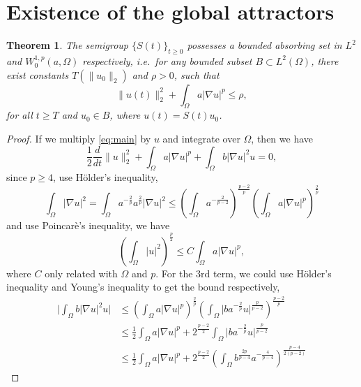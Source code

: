 \documentclass[11pt]{amsart}
\newtheorem{theorem}{Theorem}[section]
\theoremstyle{definition}
\numberwithin{equation}{section}
\newcommand*\abs[1]{\lvert#1\rvert}
\newcommand*\norm[1]{\lVert#1\rVert}
\newcommand*\Brace[1]{\lbrace#1\rbrace}
\begin{document}
\section{Existence of the global attractors}
\begin{theorem}
	The semigroup $\Brace{S(t)}_{t \geq 0} $ possesses a bounded absorbing set in
	$L^2$ and $W_0^{1,p}(a,\Omega)$ respectively, i.e.\ for any bounded subset
	$B \subset L^2(\Omega)$, there exist constants $T(\norm{u_0}_2)$ and $\rho > 0$, such that
	\begin{equation}
		\norm{u(t)}_2^2 + \int_{\Omega}a\abs{\nabla u}^p \leq \rho,
	\end{equation}
	for all $t \geq T$ and $u_0 \in B$, where $u(t) = S(t)u_0$.
\end{theorem}
\begin{proof}
	If we multiply \cref{eq:main} by $u$ and integrate over $\Omega$,
	then we have
	\begin{equation}\label{eq:operate_u}
		\frac{1}{2}\frac{d}{dt}\norm{u}_2^2
		+ \int_\Omega a\abs{\nabla u}^p
		+ \int_\Omega b\abs{\nabla u}^2u = 0,
	\end{equation}
	since $p \geq 4$, use H\"older's inequality,
	\begin{equation}
			\int_{\Omega}\abs{\nabla u}^2
			= \int_{\Omega}a^{-\frac{2}{p}}a^{\frac{2}{p}}\abs{\nabla u}^2
			\leq \left(\int_{\Omega}a^{-\frac{2}{p-2}}\right)^{\frac{p-2}{p}}
			\left(\int_{\Omega}a\abs{\nabla u}^p\right)^{\frac{2}{p}}
	\end{equation}
	and use Poincar\`e's inequality, we have
	\begin{equation}
		\left(\int_{\Omega}\abs{u}^2\right)^{\frac{p}{2}}
		\leq C\int_{\Omega}a\abs{\nabla u}^p,
	\end{equation}
	where $C$ only related with $\Omega$ and $p$. For the 3rd term, we could use
	H\"older's inequality and Young's inequality to get the bound respectively,
	\begin{equation}\label{eq:absorb_damping_u}
		\begin{split}
			\abs{\int_{\Omega}b\abs{\nabla u}^2 u}
			&\leq \left(\int_{\Omega}a\abs{\nabla u}^p\right)^{\frac{2}{p}}
			\left(\int_{\Omega}\abs{b a^{-\frac{2}{p}} u}^{\frac{p}{p-2}}\right)^{\frac{p-2}{p}}\\
			&\leq \frac{1}{2}\int_{\Omega}a\abs{\nabla u}^p
			+ 2^{\frac{p-2}{2}}\int_{\Omega}\abs{b a^{-\frac{2}{p}} u}^{\frac{p}{p-2}}\\
			&\leq \frac{1}{2}\int_{\Omega}a\abs{\nabla u}^p
			+ 2^{\frac{p-2}{2}}\left(\int_{\Omega}b^{\frac{2p}{p-4}}a^{-\frac{4}{p-4}}\right)^{\frac{p-4}{2(p-2)}}

\end{split}
\end{equation}
\end{proof}
\end{document}
